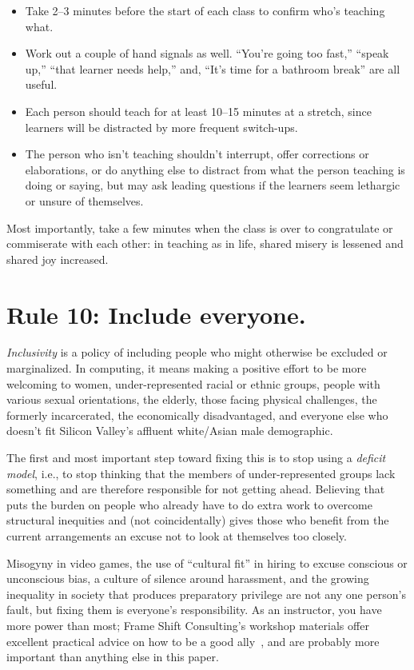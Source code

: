 \documentclass[10pt,letterpaper]{article}
\newcommand{\rulemajor}[1]{\section{#1}}
\begin{document}
\begin{itemize}

\item
  Take 2--3 minutes before the start of each class
  to confirm who's teaching what.

\item
  Work out a couple of hand signals as well.
  ``You're going too fast,''
  ``speak up,''
  ``that learner needs help,''
  and, ``It's time for a bathroom break'' are all useful.

\item
  Each person should teach for at least 10--15 minutes at a stretch,
  since learners will be distracted by more frequent switch-ups.

\item
  The person who isn't teaching shouldn't interrupt,
  offer corrections or elaborations,
  or do anything else to distract from what the person teaching is doing or saying,
  but may ask leading questions
  if the learners seem lethargic or unsure of themselves.

\end{itemize}

Most importantly,
take a few minutes when the class is over to congratulate or commiserate with each other:
in teaching as in life,
shared misery is lessened and shared joy increased.

\rulemajor{Rule 10: Include everyone.}

\emph{Inclusivity} is a policy of including people who might otherwise be excluded or marginalized.
In computing,
it means making a positive effort to be more welcoming to women,
under-represented racial or ethnic groups,
people with various sexual orientations,
the elderly,
those facing physical challenges,
the formerly incarcerated,
the economically disadvantaged,
and everyone else who doesn't fit Silicon Valley's affluent white/Asian male demographic.

The first and most important step toward fixing this is
to stop using a \emph{deficit model},
i.e.,
to stop thinking that the members of under-represented groups lack something
and are therefore responsible for not getting ahead.
Believing that puts the burden on people who already have to do extra work to overcome structural inequities
and (not coincidentally) gives those who benefit from the current arrangements
an excuse not to look at themselves too closely.

Misogyny in video games,
the use of ``cultural fit'' in hiring to excuse conscious or unconscious bias,
a culture of silence around harassment,
and the growing inequality in society that produces preparatory privilege
are not any one person's fault,
but fixing them is everyone's responsibility.
As an instructor,
you have more power than most;
Frame Shift Consulting's workshop materials offer excellent practical advice on how to be a good ally~\cite{Auro2019},
and are probably more important than anything else in this paper.
\end{document}
